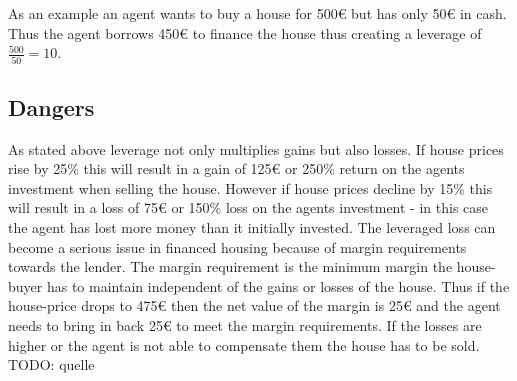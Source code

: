 \documentclass[../Bachelorarbeit.tex]{subfiles}
\begin{document}
As an example an agent wants to buy a house for 500\euro{} but has only 50\euro{} in cash. Thus the agent borrows 450\euro{} to finance the house thus creating a leverage of $\frac{500}{50} = 10$.

\subsection{Dangers}
As stated above leverage not only multiplies gains but also losses. If house prices rise by 25\% this will result in a gain of 125\euro{} or 250\% return on the agents investment when selling the house. However if house prices decline by 15\% this will result in a loss of 75\euro{} or 150\% loss on the agents investment - in this case the agent has lost more money than it initially invested. The leveraged loss can become a serious issue in financed housing because of margin requirements towards the lender. The margin requirement is the minimum margin the house-buyer has to maintain independent of the gains or losses of the house. Thus if the house-price drops to 475\euro{} then the net value of the margin is 25\euro{} and the agent needs to bring in back 25\euro{} to meet the margin requirements. If the losses are higher or the agent is not able to compensate them the house has to be sold.  TODO: quelle


\end{document}
